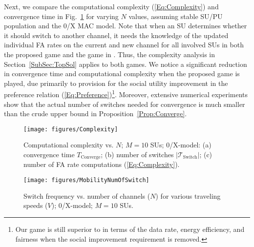 \documentclass[journal,draftclsnofoot,onecolumn]{IEEEtran}
\theoremstyle{definition}
\def\FigScale{0.6}
\def\FigScale{0.65}
\begin{document}
Next, we compare the computational complexity (\ref{Eq:Complexity}) and convergence time in Fig.~\ref{Fig:Complexity} for varying $N$ values, assuming stable SU/PU population and the 0/X MAC model. Note that when an SU determines whether it should switch to another channel, it needs the knowledge of the updated individual FA rates on the current and new channel for all involved SUs in both the proposed game and the game in \cite{HedonicSenseGame}. Thus, the complexity analysis in Section~\ref{SubSec:TopSol} applies to both games. We notice a significant reduction in convergence time and computational complexity when the proposed game is played, due primarily to provision for the social utility improvement in the preference relation (\ref{Eq:Preference})\footnote{Our game is still superior to \cite{HedonicSenseGame} in terms of the data rate, energy efficiency, and fairness when the social improvement requirement is removed.}. Moreover, extensive numerical experiments show that the actual number of switches needed for convergence is much smaller than the crude upper bound in Proposition~\ref{Prop:Converge}.

\begin{figure}[!t]
    \centering
    \texttt{[image: figures/Complexity]}
    \caption{Computational complexity vs. $N$; $M=10$ SUs; 0/X-model: (a) convergence time $T_\textrm{Converge}$; (b) number of switches $|\mathcal{T}_\textrm{Switch}|$; (c) number of FA rate computations (\ref{Eq:Complexity}).}
    \label{Fig:Complexity}
\end{figure}

\begin{figure}[!t]
    \centering
    \texttt{[image: figures/MobilityNumOfSwitch]}
    \caption{Switch frequency vs. number of channels ($N$) for various traveling speeds ($V$); 0/X-model; $M=10$ SUs.}
    \label{fig:MobilityNumOfSwitch}
\end{figure}
\end{document}
